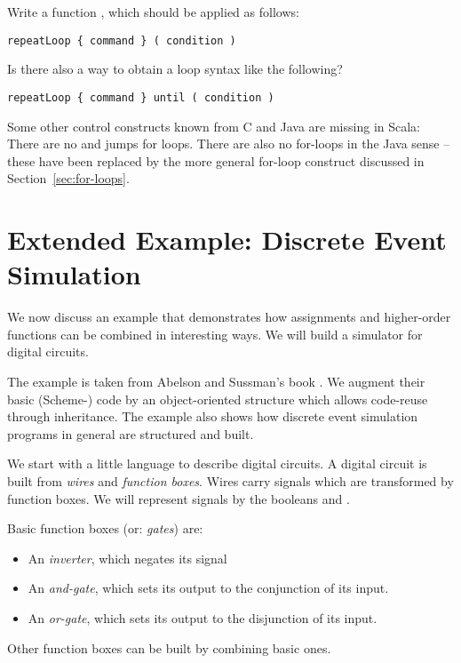 \begin{exercise} Write a function , which should be 
applied as follows:
\begin{lstlisting}
repeatLoop { command } ( condition )
\end{lstlisting}
Is there also a way to obtain a loop syntax like the following?
\begin{lstlisting}
repeatLoop { command } until ( condition )
\end{lstlisting}
\end{exercise}

Some other control constructs known from C and Java are missing in
Scala: There are no  and  jumps for loops.
There are also no for-loops in the Java sense -- these have been
replaced by the more general for-loop construct discussed in
Section~\ref{sec:for-loops}.

\section{Extended Example: Discrete Event Simulation}

We now discuss an example that demonstrates how assignments and
higher-order functions can be combined in interesting ways.  
We will build a simulator for digital circuits.

The example is taken from Abelson and Sussman's book
\cite{abelson-sussman:structure}. We augment their basic (Scheme-)
code by an object-oriented structure which allows code-reuse through
inheritance. The example also shows how discrete event simulation programs
in general are structured and built.

We start with a little language to describe digital circuits.
A digital circuit is built from {\em wires} and {\em function boxes}.
Wires carry signals which are transformed by function boxes.
We will represent signals by the booleans  and
.

Basic function boxes (or: {\em gates}) are:
\begin{itemize}
\item An \emph{inverter}, which negates its signal
\item An \emph{and-gate}, which sets its output to the conjunction of its input.
\item An \emph{or-gate}, which sets its output to the disjunction of its
input.
\end{itemize}
Other function boxes can be built by combining basic ones.

